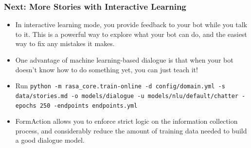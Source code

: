  \begin{frame}[fragile]\frametitle{Next: More Stories with Interactive Learning}
\begin{itemize}
\item In interactive learning mode, you provide feedback to your bot while you talk to it. This is a powerful way to explore what your bot can do, and the easiest way to fix any mistakes it makes. 
\item One advantage of machine learning-based dialogue is that when your bot doesn't know how to do something yet, you can just teach it!
\item Run \lstinline|python -m rasa_core.train-online -d config/domain.yml -s data/stories.md -o models/dialogue -u models/nlu/default/chatter -epochs 250 -endpoints endpoints.yml|
\item FormAction allows you to enforce strict logic on the information collection process, and considerably reduce the amount of training data needed to build a good dialogue model.
\end{itemize}
\end{frame}